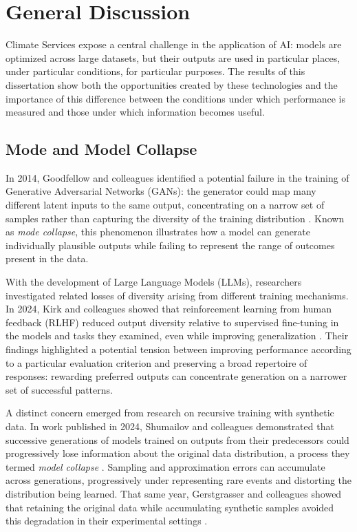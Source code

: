 \chapter{General Discussion}

Climate Services expose a central challenge in the application of AI: models are optimized across large datasets, but their outputs are used in particular places, under particular conditions, for particular purposes. The results of this dissertation show both the opportunities created by these technologies and the importance of this difference between the conditions under which performance is measured and those under which information becomes useful.

\section{Mode and Model Collapse}

In 2014, Goodfellow and colleagues identified a potential failure in the training of Generative Adversarial Networks (GANs): the generator could map many different latent inputs to the same output, concentrating on a narrow set of samples rather than capturing the diversity of the training distribution \citep{goodfellow_generative_2014}. Known as \emph{mode collapse}, this phenomenon illustrates how a model can generate individually plausible outputs while failing to represent the range of outcomes present in the data.

With the development of Large Language Models (LLMs), researchers investigated related losses of diversity arising from different training mechanisms. In 2024, Kirk and colleagues showed that reinforcement learning from human feedback (RLHF) reduced output diversity relative to supervised fine-tuning in the models and tasks they examined, even while improving generalization \citep{kirk_understanding_2024}. Their findings highlighted a potential tension between improving performance according to a particular evaluation criterion and preserving a broad repertoire of responses: rewarding preferred outputs can concentrate generation on a narrower set of successful patterns.

A distinct concern emerged from research on recursive training with synthetic data. In work published in 2024, Shumailov and colleagues demonstrated that successive generations of models trained on outputs from their predecessors could progressively lose information about the original data distribution, a process they termed \emph{model collapse} \citep{shumailov_ai_2024}. Sampling and approximation errors can accumulate across generations, progressively under representing rare events and distorting the distribution being learned. That same year, Gerstgrasser and colleagues showed that retaining the original data while accumulating synthetic samples avoided this degradation in their experimental settings \citep{gerstgrasser_is_2024}. 

